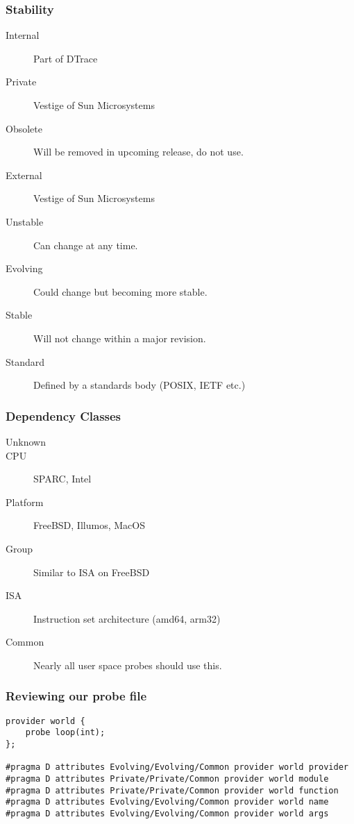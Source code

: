 \documentclass[pdftex]{beamer}
\begin{document}
\begin{frame}
  \frametitle{Stability}
  \begin{description}
  \item [Internal] Part of DTrace
  \item [Private]  Vestige of Sun Microsystems
  \item [Obsolete] Will be removed in upcoming release, do not use.
  \item [External] Vestige of Sun Microsystems
  \item [Unstable] Can change at any time.
  \item [Evolving] Could change but becoming more stable.
  \item [Stable] Will not change within a major revision.
  \item [Standard] Defined by a standards body (POSIX, IETF etc.)
  \end{description}
\end{frame}


\begin{frame}
  \frametitle{Dependency Classes}
  \begin{description}
  \item[Unknown]
  \item[CPU] SPARC, Intel
  \item[Platform] FreeBSD, Illumos, MacOS
  \item[Group] Similar to ISA on FreeBSD
  \item[ISA] Instruction set architecture (amd64, arm32)
  \item[Common] Nearly all user space probes should use this.
  \end{description}
\end{frame}

\begin{frame}[fragile]
  \frametitle{Reviewing our probe file}
\begin{lstlisting}
provider world {
	probe loop(int);
};

#pragma D attributes Evolving/Evolving/Common provider world provider
#pragma D attributes Private/Private/Common provider world module
#pragma D attributes Private/Private/Common provider world function
#pragma D attributes Evolving/Evolving/Common provider world name
#pragma D attributes Evolving/Evolving/Common provider world args
\end{lstlisting}
\end{frame}
\end{document}
